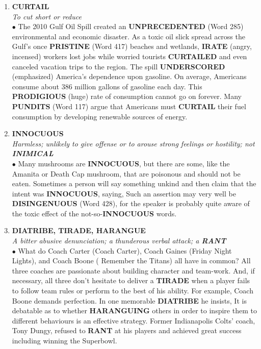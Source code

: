 \documentclass{book}
\begin{document}
\begin{enumerate}
\item \textbf{CURTAIL}\\
\textit{ To cut short or reduce}\\

$ \bullet $ The 2010 Gulf Oil Spill created an \textbf{UNPRECEDENTED} (Word 285) environmental and economic disaster. As a toxic oil slick spread across the Gulf's once \textbf{PRISTINE} (Word 417) beaches and wetlands, \textbf{IRATE} (angry, incensed) workers lost jobs while worried tourists \textbf{CURTAILED} and even canceled vacation trips to the region. The spill \textbf{UNDERSCORED} (emphasized) America's dependence upon gasoline. On average, Americans consume about 386 million gallons of gasoline each day. This \textbf{PRODIGIOUS} (huge) rate of consumption cannot go on forever. Many \textbf{PUNDITS} (Word 117) argue that Americans must \textbf{CURTAIL} their fuel consumption by developing renewable sources of energy.

\item \textbf{INNOCUOUS} \\
\textit{Harmless; unlikely to give offense or to arouse strong feelings or hostility; not \textbf{INIMICAL} }\\

$ \bullet $ Many mushrooms are \textbf{INNOCUOUS}, but there are some, like the Amanita or Death Cap mushroom, that are poisonous and should not be eaten. Sometimes a person will say something unkind and then claim that the intent was \textbf{INNOCUOUS}, saying,  Such an assertion may very well be \textbf{DISINGENUOUS} (Word 428), for the speaker is probably quite aware of the toxic effect of the not-so-\textbf{INNOCUOUS} words.

 \item \textbf{DIATRIBE, TIRADE, HARANGUE}\\
 \textit{ A bitter abusive denunciation; a thunderous verbal attack; a \textbf{RANT}} \\
 
 $ \bullet $ What do Coach Carter (Coach Carter), Coach Gaines (Friday Night Lights), and Coach Boone ( Remember the Titans) all have in common? All three coaches are passionate about building character and team-work. And, if necessary, all three don't hesitate to deliver a \textbf{TIRADE} when a player fails to follow team rules or perform to the best of his ability. For example, Coach Boone demands perfection. In one memorable \textbf{DIATRIBE} he insists,  It is debatable as to whether \textbf{HARANGUING} others in order to inspire them to different behaviours is an effective strategy. Former Indianapolis Colts' coach, Tony Dungy, refused to \textbf{RANT} at his players and achieved great success including winning the Superbowl.

\end{enumerate}
\end{document}
